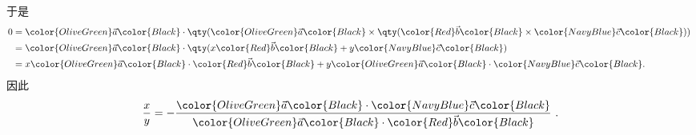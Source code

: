 于是
\begin{equation}
\begin{aligned}
0 ={}& \color{OliveGreen}\vec{a}\color{Black}\cdot\qty(\color{OliveGreen}\vec{a}\color{Black}\times\qty(\color{Red}\vec{b}\color{Black}\times\color{NavyBlue}\vec{c}\color{Black}))\\
={}& \color{OliveGreen}\vec{a}\color{Black}\cdot\qty(x\color{Red}\vec{b}\color{Black}+y\color{NavyBlue}\vec{c}\color{Black})\\
={}& x\color{OliveGreen}\vec{a}\color{Black}\cdot\color{Red}\vec{b}\color{Black}+y\color{OliveGreen}\vec{a}\color{Black}\cdot\color{NavyBlue}\vec{c}\color{Black}. 
\end{aligned}~
\end{equation}
因此
\begin{equation}
\frac{x}{y} = -\frac{\color{OliveGreen}\vec{a}\color{Black}\cdot\color{NavyBlue}\vec{c}\color{Black}}{\color{OliveGreen}\vec{a}\color{Black}\cdot\color{Red}\vec{b}\color{Black}}~. 
\end{equation}













